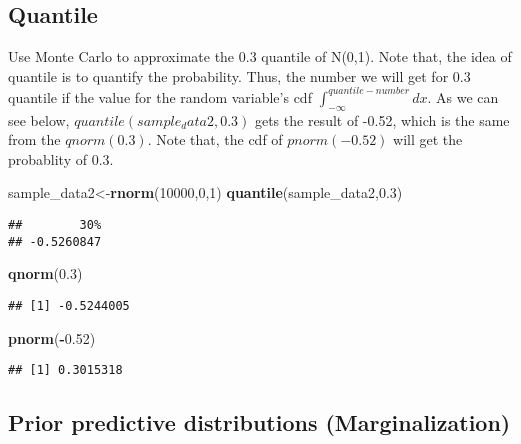 \documentclass[]{book}
\newenvironment{Shaded}{\begin{snugshade}}{\end{snugshade}}
\newcommand{\DecValTok}[1]{\textcolor[rgb]{0.00,0.00,0.81}{#1}}
\newcommand{\FloatTok}[1]{\textcolor[rgb]{0.00,0.00,0.81}{#1}}
\newcommand{\KeywordTok}[1]{\textcolor[rgb]{0.13,0.29,0.53}{\textbf{#1}}}
\newcommand{\NormalTok}[1]{#1}
\newcommand{\OperatorTok}[1]{\textcolor[rgb]{0.81,0.36,0.00}{\textbf{#1}}}
\begin{document}
\hypertarget{quantile}{%
\subsection{Quantile}\label{quantile}}

Use Monte Carlo to approximate the 0.3 quantile of N(0,1). Note that, the idea of quantile is to quantify the probability. Thus, the number we will get for 0.3 quantile if the value for the random variable's cdf \(\int_{-\infty}^{quantile-number}dx\). As we can see below, \(quantile(sample_data2,0.3)\) gets the result of -0.52, which is the same from the \(qnorm(0.3)\). Note that, the cdf of \(pnorm(-0.52)\) will get the probablity of \(0.3\).

\begin{Shaded}
\begin{Highlighting}[]
\NormalTok{sample_data2<-}\KeywordTok{rnorm}\NormalTok{(}\DecValTok{10000}\NormalTok{,}\DecValTok{0}\NormalTok{,}\DecValTok{1}\NormalTok{)}
\KeywordTok{quantile}\NormalTok{(sample_data2,}\FloatTok{0.3}\NormalTok{)}
\end{Highlighting}
\end{Shaded}

\begin{verbatim}
##        30% 
## -0.5260847
\end{verbatim}

\begin{Shaded}
\begin{Highlighting}[]
\KeywordTok{qnorm}\NormalTok{(}\FloatTok{0.3}\NormalTok{)}
\end{Highlighting}
\end{Shaded}

\begin{verbatim}
## [1] -0.5244005
\end{verbatim}

\begin{Shaded}
\begin{Highlighting}[]
\KeywordTok{pnorm}\NormalTok{(}\OperatorTok{-}\FloatTok{0.52}\NormalTok{)}
\end{Highlighting}
\end{Shaded}

\begin{verbatim}
## [1] 0.3015318
\end{verbatim}

\hypertarget{prior-predictive-distributions-marginalization}{%
\subsection{Prior predictive distributions (Marginalization)}\label{prior-predictive-distributions-marginalization}}
\end{document}
